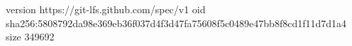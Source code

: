 version https://git-lfs.github.com/spec/v1
oid sha256:5808792da98e369eb36f037d4f3d47fa75608f5c0489e47bb8f8cd1f11d7d1a4
size 349692
